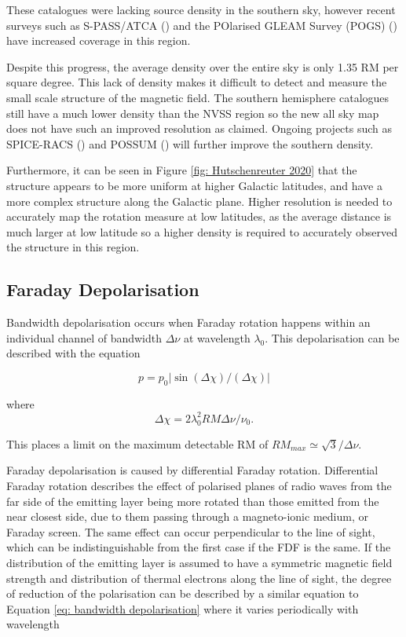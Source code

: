 These catalogues were lacking source density in the southern sky, however recent surveys such as S-PASS/ATCA (\cite{Schnitzeler_2019}) and the POlarised GLEAM Survey (POGS)
(\cite{POGS_2020}) have increased coverage in this region. 


Despite this progress, the average density over the entire sky is only 1.35 RM per square degree. This lack of density makes it difficult to detect and measure the small scale structure of the magnetic field. The southern hemisphere catalogues still have a much lower density than the NVSS region so the new all sky map does not have such an improved resolution as claimed. Ongoing projects such as SPICE-RACS (\cite{thomson2023rapidaskapcontinuumsurvey}) and POSSUM (\cite{POSSUM}) will further improve the southern density. 

Furthermore, it can be seen in Figure \ref{fig: Hutschenreuter 2020} that the structure appears to be more uniform at higher Galactic latitudes, and have a more complex structure along the Galactic plane. Higher resolution is needed to accurately map the rotation measure at low latitudes, as the average distance is much larger at low latitude so a higher density is required to accurately observed the structure in this region.  

\subsection{Faraday Depolarisation}

Bandwidth depolarisation occurs when Faraday rotation happens within an individual channel of bandwidth $\Delta\nu$ at wavelength $\lambda_0$. This depolarisation can be described with the equation

\begin{equation}
    p = p_0 |\sin(\Delta\chi)/(\Delta\chi)|
    \label{eq: bandwidth depolarisation}
\end{equation}

where 
\begin{equation}
   \Delta\chi = 2\lambda_0^2RM\Delta\nu/\nu_0.
   \label{eq: deltachi}
\end{equation}


This places a limit on the maximum detectable RM of $RM_{max} \simeq \sqrt{3}/\Delta\nu$. 

Faraday depolarisation is caused by differential Faraday rotation. Differential Faraday rotation describes the effect of polarised planes of radio waves from the far side of the emitting layer being more rotated than those emitted from the near closest side, due to them passing through a magneto-ionic medium, or Faraday screen. The same effect can occur perpendicular to the line of sight, which can be indistinguishable from the first case if the FDF is the same. If the distribution of the emitting layer is assumed to have a symmetric magnetic field strength and distribution of thermal electrons along the line of sight, the degree of reduction of the polarisation can be described by a similar equation to Equation \ref{eq: bandwidth depolarisation} where it varies periodically with wavelength

